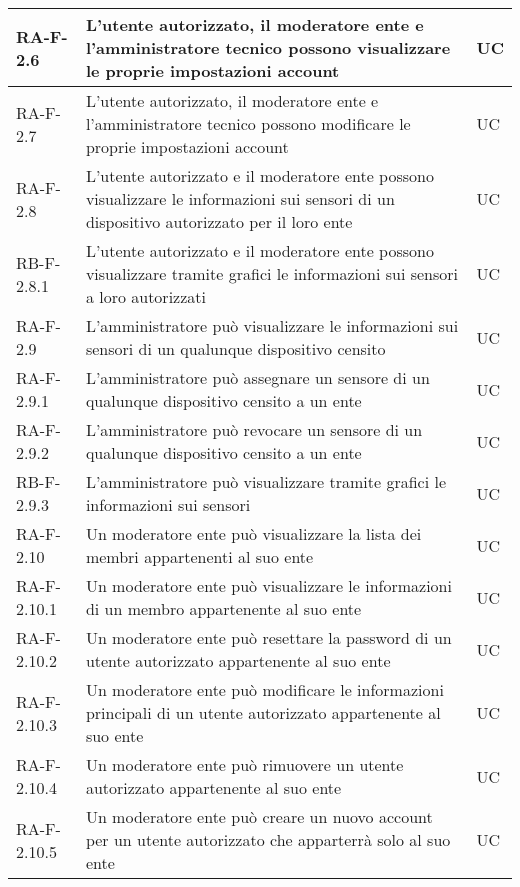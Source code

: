 \begin{center}
\begin{longtable}{|p{3cm}|p{9.85cm}|p{2cm}|}
		{\color{gray} RA-F-}2.6 & L'utente autorizzato, il moderatore ente e l'amministratore tecnico possono visualizzare le proprie impostazioni account & UC \\ \hline
		{\color{gray} RA-F-}2.7 & L'utente autorizzato, il moderatore ente e l'amministratore tecnico possono modificare le proprie impostazioni account & UC \\ \hline
		
		{\color{gray} RA-F-}2.8 & L'utente autorizzato e il moderatore ente possono visualizzare le informazioni sui sensori di un dispositivo autorizzato per il loro ente & UC \\ \hline
		{\color{gray} RB-F-}2.8.1 & L'utente autorizzato e il moderatore ente possono visualizzare tramite grafici le informazioni sui sensori a loro autorizzati & UC \\ \hline
		{\color{gray} RA-F-}2.9 & L'amministratore può visualizzare le informazioni sui sensori di un qualunque dispositivo censito & UC \\ \hline
		{\color{gray} RA-F-}2.9.1 & L'amministratore può assegnare un sensore di un qualunque dispositivo censito a un ente & UC \\ \hline
		{\color{gray} RA-F-}2.9.2 & L'amministratore può revocare un sensore di un qualunque dispositivo censito a un ente & UC \\ \hline
		{\color{gray} RB-F-}2.9.3 & L'amministratore può visualizzare tramite grafici le informazioni sui sensori & UC \\ \hline

		{\color{gray} RA-F-}2.10 & Un moderatore ente può visualizzare la lista dei membri appartenenti al suo ente & UC \\ \hline
		{\color{gray} RA-F-}2.10.1 & Un moderatore ente può visualizzare le informazioni di un membro appartenente al suo ente & UC \\ \hline
		{\color{gray} RA-F-}2.10.2 & Un moderatore ente può resettare la password di un utente autorizzato appartenente al suo ente & UC \\ \hline
		{\color{gray} RA-F-}2.10.3 & Un moderatore ente può modificare le informazioni principali di un utente autorizzato appartenente al suo ente & UC \\ \hline
		{\color{gray} RA-F-}2.10.4 & Un moderatore ente può rimuovere un utente autorizzato appartenente al suo ente & UC \\ \hline
		{\color{gray} RA-F-}2.10.5 & Un moderatore ente può creare un nuovo account per un utente autorizzato che apparterrà solo al suo ente & UC \\ \hline


\end{longtable}
\end{center}
